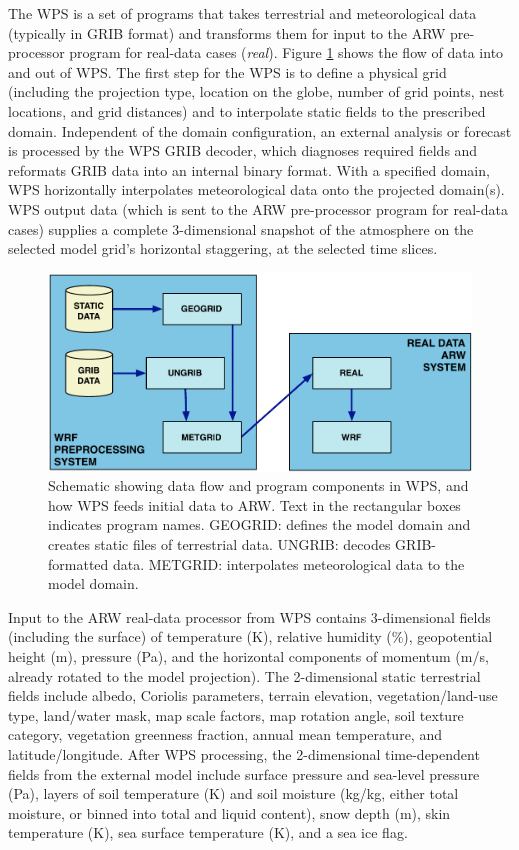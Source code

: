 The WPS is a set of programs that takes
terrestrial and meteorological data (typically in GRIB format) and transforms them for input to
the ARW pre-processor program for real-data cases ({\it real}).
Figure \ref {figure:WPS_real_wrf} shows the flow of data into and out of WPS.  
The first step for the WPS is to define a physical grid (including
the projection type, location on the globe, 
number of grid points, nest locations, and grid distances) and
to interpolate static fields to the prescribed domain.
Independent of the domain configuration,
an external analysis or forecast is processed by the WPS GRIB decoder,
which diagnoses required fields and
reformats GRIB data into an internal binary format.
With a specified domain,
WPS horizontally interpolates meteorological data onto the projected domain(s). 
WPS output data (which is sent to the ARW pre-processor program for real-data cases) 
supplies a complete 3-dimensional snapshot of the atmosphere
on the selected model grid's horizontal staggering, at the selected time slices.

%
%
\begin{figure}
  \centering
  \includegraphics[width=6in]{figures/WPS_real_wrf.pdf}
  \caption{\label{figure:WPS_real_wrf}Schematic showing 
data flow and program components in WPS, and how WPS feeds initial data to ARW.
Text in the rectangular boxes indicates program names.
GEOGRID: defines the model domain and creates static files of terrestrial data.  UNGRIB:
decodes GRIB-formatted data. METGRID: interpolates meteorological data to the model domain.}
\end{figure}

Input to the ARW real-data processor from 
WPS contains 3-dimensional fields (including
the surface) of temperature (K), relative humidity
(\%), geopotential height (m), pressure (Pa), 
and the horizontal components of momentum (m/s, already rotated to the model 
projection).  
The 2-dimensional static terrestrial fields include
albedo, Coriolis parameters, terrain elevation, vegetation/land-use type, 
land/water mask, map scale factors, map rotation angle, soil texture category, vegetation greenness fraction, 
annual mean temperature, 
and latitude/longitude.  
After WPS processing, the 2-dimensional time-dependent fields from the external model include 
surface pressure and sea-level pressure (Pa), layers of soil temperature (K) and  soil moisture (kg/kg, 
either total moisture, or 
binned into total and liquid content), 
snow depth (m), skin temperature (K), sea surface temperature (K), and a sea ice flag.  

